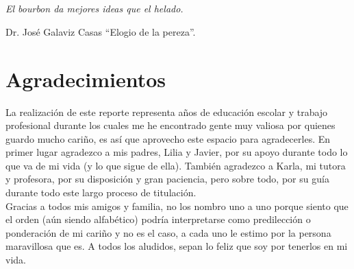 \chapter*{}\label{epigrafe}
\thispagestyle{empty}
\begin{flushright}
	\begin{Large}
		\textit{El bourbon da mejores ideas que el helado.}\\
	\end{Large}
Dr. José Galaviz Casas ``Elogio de la pereza''.
\end{flushright}
\clearpage

\chapter*{Agradecimientos}\label{agradecimientos}
\thispagestyle{empty}
\noindent La realización de este reporte representa años de educación escolar y trabajo profesional durante los cuales me he encontrado gente muy valiosa por quienes guardo mucho cariño, es así que aprovecho este espacio para agradecerles. En primer lugar agradezco a mis padres, Lilia y Javier, por su apoyo durante todo lo que va de mi vida (y lo que sigue de ella). También agradezco a Karla, mi tutora y profesora, por su disposición y gran paciencia, pero sobre todo, por su guía durante todo este largo proceso de titulación.\\
\indent Gracias a todos mis amigos y familia, no los nombro uno a uno porque siento que el orden (aún siendo alfabético) podría interpretarse como predilección o ponderación de mi cariño y no es el caso, a cada uno le estimo por la persona maravillosa que es. A todos los aludidos, sepan lo feliz que soy por tenerlos en mi vida.
\clearpage
